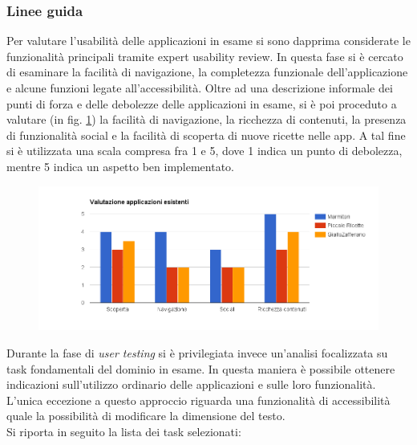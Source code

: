 \subsubsection{Linee guida}
Per valutare l'usabilità delle applicazioni in esame si sono dapprima considerate le
funzionalità principali tramite expert usability review.  In questa fase si è
cercato di esaminare la facilità di navigazione, la completezza funzionale
dell'applicazione e alcune funzioni legate all'accessibilità. 
Oltre ad una descrizione informale dei punti di forza e delle debolezze delle applicazioni in esame,
si è poi proceduto a valutare (in fig. \ref{fig:valutazionelineeguida}) la facilità di navigazione, la ricchezza
di contenuti, la presenza di funzionalità social e la facilità di scoperta di nuove ricette nelle app.
A tal fine si è utilizzata una scala compresa fra 1 e 5, dove 1 indica un punto di debolezza, mentre
5 indica un aspetto ben implementato.\\
\begin{figure}[H]
 \centering
 \includegraphics[width=\textwidth]{img/valutazionelineeguida}
 \label{fig:valutazionelineeguida}
\end{figure}
Durante la fase
di \emph{user testing} si è privilegiata invece un'analisi focalizzata su task
fondamentali del dominio in esame.  In questa maniera è possibile ottenere
indicazioni sull'utilizzo ordinario delle applicazioni e sulle loro
funzionalità.  L'unica eccezione a questo approccio riguarda una funzionalità di
accessibilità quale la possibilità di modificare la dimensione del testo.\\
Si riporta in seguito la lista dei task selezionati:
